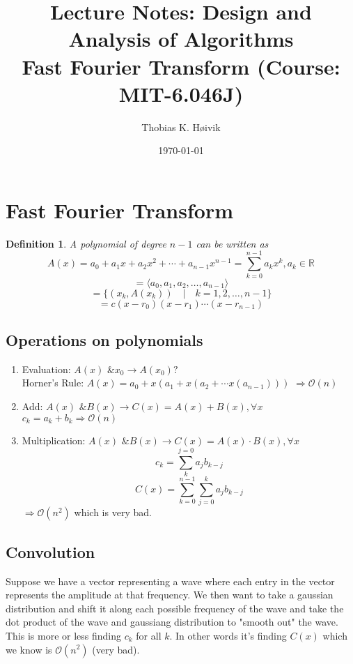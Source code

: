 \documentclass[12pt]{article}
\title{Lecture Notes: Design and Analysis of Algorithms \\ 
Fast Fourier Transform (Course: MIT-6.046J)}
\author{Thobias K. Høivik}
\date{\today}
\newtheorem{definition}{Definition}
\begin{document}
\maketitle
\section*{Fast Fourier Transform}
\begin{definition}
    A polynomial of degree \(n-1\) can be written as 
    \[A(x) = a_0 + a_1x + a_2x^2 + \cdots + a_{n-1}x^{n-1} 
    = \displaystyle\sum_{k = 0}^{n-1} a_{k}x^{k}, a_k \in \mathbb R \]
    \[ 
        = \langle a_0, a_1, a_2, \dots, a_{n-1} \rangle
    \]
    \[ 
        = \{(x_k, A(x_k)) \quad|\quad k = 1,2,\dots,n-1\}
    \]
    \[ 
        = c(x-r_0)(x-r_1)\cdots(x-r_{n-1})
    \]

\end{definition}

\subsection*{Operations on polynomials}
\begin{enumerate}
    \item Evaluation: \(A(x) \text{ \& } x_0 \rightarrow A(x_0)?\)
        \\ Horner's Rule: \(A(x) = a_0 + x(a_1 + x(a_2 + \cdots x(a_{n-1})))\)
        \(\Rightarrow \mathcal O (n)\)
    \item Add: \(A(x) \text{ \& } B(x) \rightarrow C(x) = A(x) + B(x), \forall x\) 
        \\ \(c_k = a_k + b_k \Rightarrow \mathcal O(n)\)
    \item Multiplication: \(A(x) \text{ \& } B(x) 
        \rightarrow C(x) = A(x) \cdot B(x), \forall x\)
        \[ 
            c_k = \displaystyle\sum_{k}^{j=0}a_j b_{k-j}
        \]
        \[ 
            C(x) = \displaystyle\sum^{n-1}_{k=0}\displaystyle\sum^{k}_{j=0}a_jb_{k-j}
        \]
        \(\Rightarrow \mathcal O(n^2)\) which is very bad.
\end{enumerate}

\subsection*{Convolution}
Suppose we have a vector representing a wave where each entry in the vector represents 
the amplitude at that frequency. We then want to take a gaussian distribution and shift 
it along each possible frequency of the wave and take the dot product of the wave 
and gaussiang distribution to "smooth out" the wave.
This is more or less finding \(c_k\) for all \(k\). In other words it's finding 
\(C(x)\) which we know is \(\mathcal O(n^2)\) (very bad).
\end{document}
